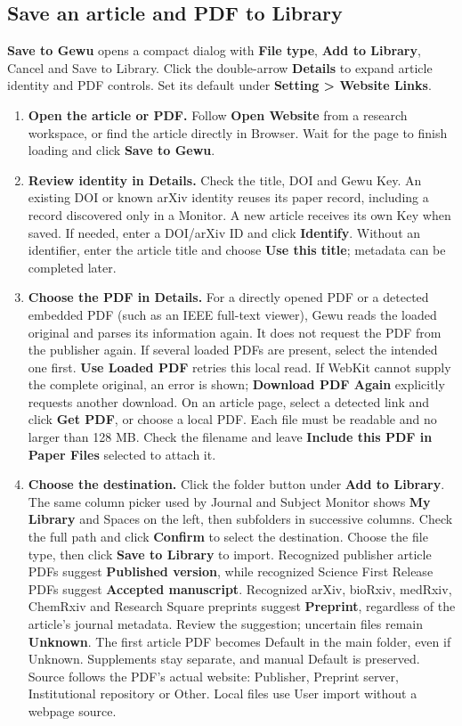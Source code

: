 \documentclass[10pt,letterpaper,oneside]{scrreprt}
\providecommand{\tightlist}{\setlength{\itemsep}{1pt}\setlength{\parskip}{0pt}}
\begin{document}
\subsection{Save an article and PDF to Library}\label{browser-save-gewu}

\textbf{Save to Gewu} opens a compact dialog with \textbf{File type}, \textbf{Add to Library}, Cancel and Save to Library. Click the double-arrow \textbf{Details} to expand article identity and PDF controls. Set its default under \textbf{Setting \textgreater{} Website Links}.

\begin{enumerate}
\tightlist
\item
  \textbf{Open the article or PDF.} Follow \textbf{Open Website} from a research workspace, or find the article directly in Browser. Wait for the page to finish loading and click \textbf{Save to Gewu}.
\item
  \textbf{Review identity in Details.} Check the title, DOI and Gewu Key. An existing DOI or known arXiv identity reuses its paper record, including a record discovered only in a Monitor. A new article receives its own Key when saved. If needed, enter a DOI/arXiv ID and click \textbf{Identify}. Without an identifier, enter the article title and choose \textbf{Use this title}; metadata can be completed later.
\item
  \textbf{Choose the PDF in Details.} For a directly opened PDF or a detected embedded PDF (such as an IEEE full-text viewer), Gewu reads the loaded original and parses its information again. It does not request the PDF from the publisher again. If several loaded PDFs are present, select the intended one first. \textbf{Use Loaded PDF} retries this local read. If WebKit cannot supply the complete original, an error is shown; \textbf{Download PDF Again} explicitly requests another download. On an article page, select a detected link and click \textbf{Get PDF}, or choose a local PDF. Each file must be readable and no larger than 128 MB. Check the filename and leave \textbf{Include this PDF in Paper Files} selected to attach it.
\item
  \textbf{Choose the destination.} Click the folder button under \textbf{Add to Library}. The same column picker used by Journal and Subject Monitor shows \textbf{My Library} and Spaces on the left, then subfolders in successive columns. Check the full path and click \textbf{Confirm} to select the destination. Choose the file type, then click \textbf{Save to Library} to import. Recognized publisher article PDFs suggest \textbf{Published version}, while recognized Science First Release PDFs suggest \textbf{Accepted manuscript}. Recognized arXiv, bioRxiv, medRxiv, ChemRxiv and Research Square preprints suggest \textbf{Preprint}, regardless of the article's journal metadata. Review the suggestion; uncertain files remain \textbf{Unknown}. The first article PDF becomes Default in the main folder, even if Unknown. Supplements stay separate, and manual Default is preserved. Source follows the PDF's actual website: Publisher, Preprint server, Institutional repository or Other. Local files use User import without a webpage source.
\end{enumerate}
\end{document}

